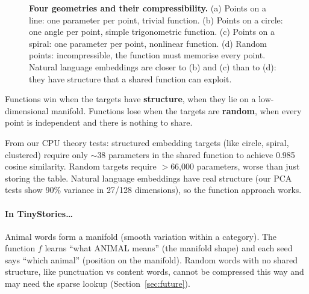 \documentclass[11pt, a4paper]{article}
\theoremstyle{remark}
\begin{document}
\begin{figure}[h]
\caption{\textbf{Four geometries and their compressibility.}
(a) Points on a line: one parameter per point, trivial function.
(b) Points on a circle: one angle per point, simple trigonometric function.
(c) Points on a spiral: one parameter per point, nonlinear function.
(d) Random points: incompressible, the function must memorise every point.
Natural language embeddings are closer to (b) and (c) than to (d): they have structure that a shared function can exploit.}
\label{fig:four-geometries}
\end{figure}

Functions win when the targets have \textbf{structure}, when they lie on a low-dimensional manifold.
Functions lose when the targets are \textbf{random}, when every point is independent and there is nothing to share.

From our CPU theory tests: structured embedding targets (like circle, spiral, clustered) require only $\sim$38 parameters in the shared function to achieve 0.985 cosine similarity.
Random targets require $>$66,000 parameters, worse than just storing the table.
Natural language embeddings have real structure (our PCA tests show 90\% variance in 27/128 dimensions), so the function approach works.

\paragraph{In TinyStories\ldots}
Animal words form a manifold (smooth variation within a category).
The function $f$ learns ``what ANIMAL means'' (the manifold shape) and each seed says ``which animal'' (position on the manifold).
Random words with no shared structure, like punctuation vs content words, cannot be compressed this way and may need the sparse lookup (Section~\ref{sec:future}).
\end{document}
